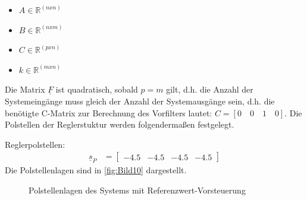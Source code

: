 \begin{itemize}
    \item $A\in\mathbb{R}^{(nxn)}$
    \item $B\in\mathbb{R}^{(nxm)}$
    \item $C\in\mathbb{R}^{(pxn)}$
    \item $k\in\mathbb{R}^{(mxn)}$
\end{itemize}

Die Matrix $\underline{F}$ ist quadratisch, sobald $p = m$ gilt, d.h. die Anzahl der Systemeingänge muss gleich der Anzahl der Systemausgänge sein, d.h. die benötigte C-Matrix zur Berechnung des Vorfilters lautet: $C = [0\quad 0\quad 1\quad 0]$.
Die Polstellen der Reglerstuktur werden folgendermaßen festgelegt.

\clearpage

Reglerpolstellen:
\begin{align}\label{eq:Gleichung56}
    \underline{s}_{P} &=
    \begin{bmatrix}
        -4.5 & -4.5 & -4.5 & -4.5
    \end{bmatrix}
\end{align}
\newline
Die Polstellenlagen sind in \autoref{fig:Bild10} dargestellt.

\begin{figure}[H]
    \centering
    \caption[Polstellenlage Vorsteuerung]{Polstellenlagen des Systems mit Referenzwert-Vorsteuerung}
    \label{fig:Bild10}
\end{figure}

